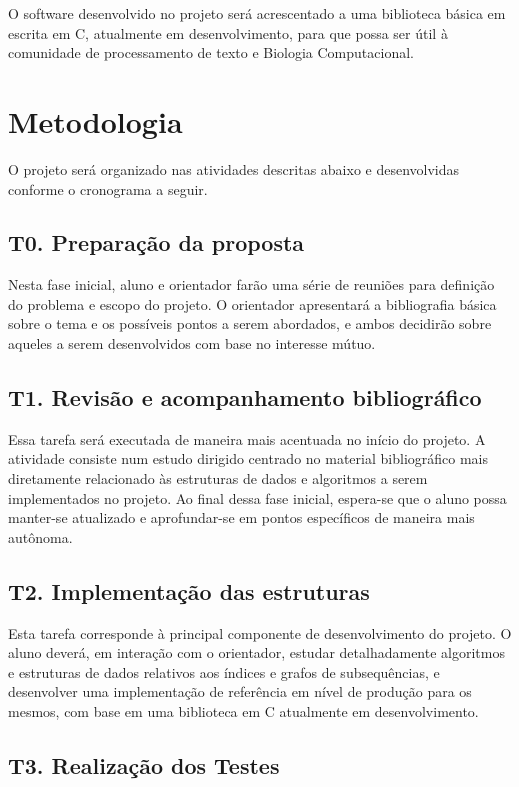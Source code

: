 \documentclass[12pt, a4paper, oneside]{article}
\begin{document}
O software desenvolvido no projeto será acrescentado a uma biblioteca básica em escrita em C, atualmente em desenvolvimento, para que possa ser útil à comunidade de processamento de texto e Biologia Computacional.


\clearpage
\section{Metodologia}

O projeto será organizado nas atividades descritas abaixo e desenvolvidas conforme o cronograma a seguir.

\subsection{T0. Preparação da proposta}

Nesta fase inicial, aluno e orientador farão uma série de reuniões para definição do problema e escopo do projeto. O orientador apresentará a bibliografia básica sobre o tema e os possíveis pontos a serem abordados, e ambos decidirão sobre aqueles a serem desenvolvidos com base no  interesse mútuo.

\subsection{T1. Revisão e acompanhamento bibliográfico}

Essa tarefa será executada de maneira mais acentuada no início do projeto. A atividade consiste num estudo dirigido centrado no  material bibliográfico mais diretamente relacionado às estruturas de dados e algoritmos a serem implementados no projeto. Ao final dessa fase inicial, espera-se que o aluno possa manter-se atualizado e aprofundar-se em pontos específicos de maneira mais autônoma.


\subsection{T2. Implementação das estruturas}

Esta tarefa corresponde à principal componente de desenvolvimento do projeto. O aluno deverá, em interação com o orientador, estudar detalhadamente algoritmos e estruturas de dados relativos aos índices e grafos de subsequências, e desenvolver uma implementação de referência em nível de produção para os mesmos, com base em uma biblioteca em C atualmente em desenvolvimento.


\subsection{T3. Realização dos Testes}
\end{document}
